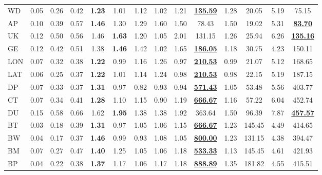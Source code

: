 \begin{sidewaystable}
\begin{tabular}{@{}l *{13}{c}@{}}
WD & 0.05 & 0.26 & 0.42 & \textbf{1.23} & 1.01 & 1.12 & 1.02 & 1.21 & \underline{\textbf{135.59}} & 1.28 & 20.05 & 5.19 & 75.15 \\
AP & 0.10 & 0.39 & 0.57 & \textbf{1.46} & 1.30 & 1.29 & 1.60 & 1.50 & 78.43 & 1.50 & 19.02 & 5.31 & \underline{\textbf{83.70}} \\
UK & 0.12 & 0.50 & 0.56 & 1.46 & \textbf{1.63} & 1.20 & 1.05 & 2.01 & 131.15 & 1.26 & 25.94 & 6.26 & \underline{\textbf{135.16}} \\
GE & 0.12 & 0.42 & 0.51 & 1.38 & \textbf{1.46} & 1.42 & 1.02 & 1.65 & \underline{\textbf{186.05}} & 1.18 & 30.75 & 4.23 & 150.11 \\
LON & 0.07 & 0.32 & 0.38 & \textbf{1.22} & 0.99 & 1.16 & 1.26 & 0.97 & \underline{\textbf{210.53}} & 0.99 & 21.07 & 5.12 & 168.65 \\
LAT & 0.06 & 0.25 & 0.37 & \textbf{1.22} & 1.01 & 1.14 & 1.24 & 0.98 & \underline{\textbf{210.53}} & 0.98 & 22.15 & 5.19 & 187.15 \\
DP & 0.07 & 0.33 & 0.37 & \textbf{1.31} & 0.97 & 0.82 & 0.93 & 0.94 & \underline{\textbf{571.43}} & 1.05 & 53.48 & 5.56 & 403.77 \\
CT & 0.07 & 0.34 & 0.41 & \textbf{1.28} & 1.10 & 1.15 & 0.90 & 1.19 & \underline{\textbf{666.67}} & 1.16 & 57.22 & 6.04 & 452.74 \\
DU & 0.15 & 0.58 & 0.66 & 1.62 & \textbf{1.95} & 1.38 & 1.38 & 1.92 & 363.64 & 1.50 & 96.39 & 7.87 & \underline{\textbf{457.57}} \\
BT & 0.03 & 0.18 & 0.39 & \textbf{1.31} & 0.97 & 1.05 & 1.06 & 1.15 & \underline{\textbf{666.67}} & 1.23 & 145.45 & 4.49 & 414.65 \\
BW & 0.04 & 0.17 & 0.37 & \textbf{1.46} & 0.99 & 0.93 & 1.08 & 1.05 & \underline{\textbf{800.00}} & 1.23 & 131.15 & 4.38 & 394.47 \\
BM & 0.07 & 0.27 & 0.47 & \textbf{1.40} & 1.25 & 1.05 & 1.06 & 1.18 & \underline{\textbf{533.33}} & 1.13 & 145.45 & 4.61 & 421.93 \\
BP & 0.04 & 0.22 & 0.38 & \textbf{1.37} & 1.17 & 1.06 & 1.17 & 1.18 & \underline{\textbf{888.89}} & 1.35 & 181.82 & 4.55 & 415.51 \\
\bottomrule
\end{tabular}
\end{sidewaystable}
